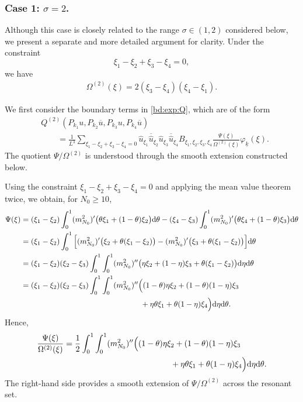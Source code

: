 \documentclass[UTF-8,reqno]{amsart}
\numberwithin{equation}{section}
\theoremstyle{definition}
\def\dif{{\mathord{{\rm d}}}}
\def\geq{\geqslant}
\def\dif{{\mathord{{\rm d}}}}
\def\geq{\geqslant}
\begin{document}
\subsubsection{Case 1: $\sigma=2$.}

Although this case is closely related to the range $\sigma\in(1,2)$
considered below, we present a separate and more detailed argument for
clarity. Under the constraint
\[
    \xi_1-\xi_2+\xi_3-\xi_4=0,
\]
we have
\begin{align*}
    \Omega^{(2)}(\xi)
    =2(\xi_3-\xi_4)(\xi_4-\xi_1).
\end{align*}

We first consider the boundary terms in \eqref{bd:exp:Q}, which are of
the form
\begin{align*}
&Q^{(2)}
  (P_{k_1}u,P_{k_2}\overline u,P_{k_3}u,P_{k_4}\overline u)
\\
&\qquad
=\frac{1}{L^{3}}
\sum_{\xi_1-\xi_2+\xi_3-\xi_4=0}
\widehat{u}_{\xi_1}
\overline{\widehat{u}}_{\xi_2}
\widehat{u}_{\xi_3}
\overline{\widehat{u}}_{\xi_4}
B_{\xi_1,\xi_2,\xi_3,\xi_4}
\frac{\Psi(\xi)}{\Omega^{(2)}(\xi)}
\varphi_{\underline k}(\xi).
\end{align*}
The quotient $\Psi/\Omega^{(2)}$ is understood through the smooth
extension constructed below.

Using the constraint
$\xi_1-\xi_2+\xi_3-\xi_4=0$ and applying the mean value theorem twice,
we obtain, for $N_0\geq10$,
\begin{align}
\Psi(\xi)
&=(\xi_1-\xi_2)
  \int_0^1
  (m_{N_0}^2)'
  \bigl(\theta\xi_1+(1-\theta)\xi_2\bigr)
  \dif\theta 
-(\xi_4-\xi_3)
  \int_0^1
  (m_{N_0}^2)'
  \bigl(\theta\xi_4+(1-\theta)\xi_3\bigr)
  \dif\theta
\notag\\
&=(\xi_1-\xi_2)
  \int_0^1
  \Big[
      (m_{N_0}^2)'
      \bigl(\xi_2+\theta(\xi_1-\xi_2)\bigr) 
      -(m_{N_0}^2)'
      \bigl(\xi_3+\theta(\xi_1-\xi_2)\bigr)
  \Big]
  \dif\theta
\notag\\
&=(\xi_1-\xi_2)(\xi_2-\xi_3)
  \int_0^1\int_0^1
  (m_{N_0}^2)''
  \bigl(
      \eta\xi_2+(1-\eta)\xi_3
      +\theta(\xi_1-\xi_2)
  \bigr)
  \dif\eta\dif\theta
\notag\\
&=(\xi_1-\xi_2)(\xi_2-\xi_3)
  \int_0^1\int_0^1
  (m_{N_0}^2)''
  \Big(
      (1-\theta)\eta\xi_2
      +(1-\theta)(1-\eta)\xi_3
\notag\\
&\hspace{5.5cm}
      +\eta\theta\xi_1
      +\theta(1-\eta)\xi_4
  \Big)
  \dif\eta\dif\theta.
\label{bd:phi=}
\end{align}
 Hence, 
\begin{align*}
\frac{\Psi(\xi)}{\Omega^{(2)}(\xi)}
&=
\frac12
\int_0^1\int_0^1
(m_{N_0}^2)''
\Big(
    (1-\theta)\eta\xi_2
    +(1-\theta)(1-\eta)\xi_3
\\
&\hspace{4.6cm}
    +\eta\theta\xi_1
    +\theta(1-\eta)\xi_4
\Big)
\dif\eta\dif\theta.
\end{align*}
The right-hand side provides a smooth extension of
$\Psi/\Omega^{(2)}$ across the resonant set.
\end{document}
